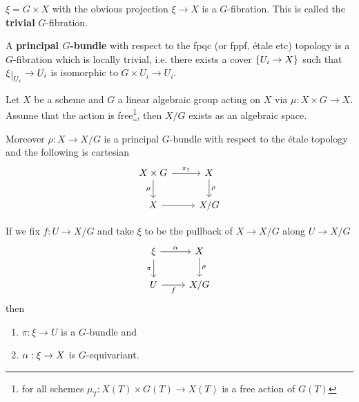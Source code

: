 \begin{example}
$\xi=G\times X$ with the obvious projection $\xi\to X$ is a $G$-fibration. This is called the \textbf{trivial} $G$-fibration.
\end{example}

\begin{definition}
A \textbf{principal $G$-bundle} with respect to the fpqc (or fppf, \'etale etc) topology is a $G$-fibration which is locally trivial, i.e. there exists a cover $\left\{{U_i\to X}\right\}$ such that $\xi\res {U_i}\to U_i$ is isomorphic to $G\times U_i\to U_i$.
\end{definition}


\begin{proposition}
Let $X$ be a scheme and $G$ a linear algebraic group acting on $X$ via $\mu:X\times G\to X$. Assume that the action is free\footnote{for all schemes $\mu_T:X(T)\times G(T)\to X(T)$ is a free action of $G(T)$}, then $X/G$ exists as an algebraic space.

Moreover $\rho:X\to X/G$ is a principal $G$-bundle with respect to the \'etale topology and the following is cartesian
\[\begin{tikzcd}
	{X\times G} & X \\
	X & {X/G}
	\arrow["{\pi_1}", from=1-1, to=1-2]
	\arrow["\mu"', from=1-1, to=2-1]
	\arrow["\rho", from=1-2, to=2-2]
	\arrow[from=2-1, to=2-2]
\end{tikzcd}\]
\end{proposition}

\begin{remark}
If we fix $f:U\to X/G$ and take $\xi$ to be the pullback of $X\to X/G$ along $U\to X/G$ 
\[\begin{tikzcd}
	\xi & X \\
	U & {X/G}
	\arrow["\al", from=1-1, to=1-2]
	\arrow["\pi"', from=1-1, to=2-1]
	\arrow["\rho", from=1-2, to=2-2]
	\arrow["f"', from=2-1, to=2-2]
\end{tikzcd}\]
then
\begin{enumerate}
    \item $\pi:\xi\to U$ is a $G$-bundle and
    \item $\alpha:\xi\to X$ is $G$-equivariant.
\end{enumerate}
\end{remark}


